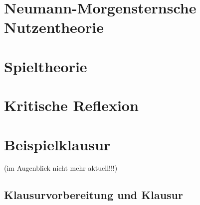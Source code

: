 \documentclass[12pt, a4paper, german]{book}
\numberwithin{equation}{section}
\begin{document}

\newpage


\newpage

\newpage




\chapter{Neumann-Morgensternsche Nutzentheorie} 


\newpage


\newpage

\newpage

 

\chapter{Spieltheorie}


\newpage


\newpage

\newpage



\chapter{Kritische Reflexion}



\chapter{Beispielklausur}
(im Augenblick nicht mehr aktuell!!!) 

\section{Klausurvorbereitung und Klausur}

\newpage

\newpage

  


\end{document}
